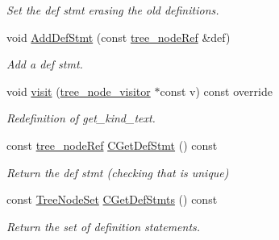 \begin{DoxyCompactItemize}
\begin{DoxyCompactList}\small\item\em Set the def stmt erasing the old definitions. \end{DoxyCompactList}\item 
void \hyperlink{structssa__name_a1f3d0e202b839a3e0646b808ebd06d13}{Add\+Def\+Stmt} (const \hyperlink{tree__node_8hpp_a6ee377554d1c4871ad66a337eaa67fd5}{tree\+\_\+node\+Ref} \&def)
\begin{DoxyCompactList}\small\item\em Add a def stmt. \end{DoxyCompactList}\item 
void \hyperlink{structssa__name_a9dd9ab89f7b91f1698c66869146a89dd}{visit} (\hyperlink{classtree__node__visitor}{tree\+\_\+node\+\_\+visitor} $\ast$const v) const override
\begin{DoxyCompactList}\small\item\em Redefinition of get\+\_\+kind\+\_\+text. \end{DoxyCompactList}\item 
const \hyperlink{tree__node_8hpp_a6ee377554d1c4871ad66a337eaa67fd5}{tree\+\_\+node\+Ref} \hyperlink{structssa__name_a5d12d1a11bc039f5e66a40c846cd3f0b}{C\+Get\+Def\+Stmt} () const
\begin{DoxyCompactList}\small\item\em Return the def stmt (checking that is unique) \end{DoxyCompactList}\item 
const \hyperlink{classTreeNodeSet}{Tree\+Node\+Set} \hyperlink{structssa__name_acfdd901ceb0b0c109c6aeb8ab905aa16}{C\+Get\+Def\+Stmts} () const
\begin{DoxyCompactList}\small\item\em Return the set of definition statements. \end{DoxyCompactList}\end{DoxyCompactItemize}

